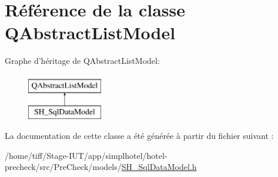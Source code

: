 \hypertarget{classQAbstractListModel}{\section{Référence de la classe Q\-Abstract\-List\-Model}
\label{classQAbstractListModel}
}
Graphe d'héritage de Q\-Abstract\-List\-Model\-:\begin{figure}[H]
\begin{center}
\leavevmode
\includegraphics[height=2.000000cm]{classQAbstractListModel}
\end{center}
\end{figure}


La documentation de cette classe a été générée à partir du fichier suivant \-:\begin{DoxyCompactItemize}
\item 
/home/tiff/\-Stage-\/\-I\-U\-T/app/simplhotel/hotel-\/precheck/src/\-Pre\-Check/models/\hyperlink{SH__SqlDataModel_8h}{S\-H\-\_\-\-Sql\-Data\-Model.\-h}\end{DoxyCompactItemize}
